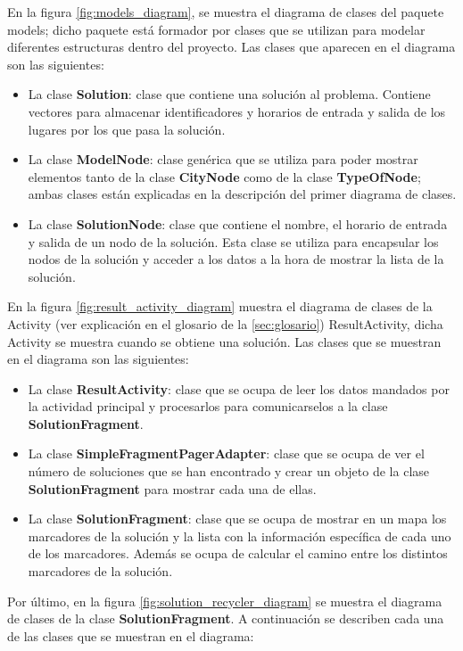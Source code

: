 \vspace{0.06in}
En la figura \ref{fig:models_diagram}, se muestra el diagrama de clases del paquete models; dicho paquete está formador por clases que se utilizan para modelar diferentes estructuras dentro del proyecto. Las clases que aparecen en el diagrama son las siguientes:
\begin{itemize}
	\item La clase \textbf{Solution}: clase que contiene una solución al problema. Contiene vectores para almacenar identificadores y horarios de entrada y salida de los lugares por los que pasa la solución.
	\item La clase \textbf{ModelNode}: clase genérica que se utiliza para poder mostrar elementos tanto de la clase \textbf{CityNode} como de la clase \textbf{TypeOfNode}; ambas clases están explicadas en la descripción del primer diagrama de clases.
	\item La clase \textbf{SolutionNode}: clase que contiene el nombre, el horario de entrada y salida de un nodo de la solución. Esta clase se utiliza para encapsular los nodos de la solución y acceder a los datos a la hora de mostrar la lista de la solución.
\end{itemize}
\vspace{0.06in}
En la figura \ref{fig:result_activity_diagram} muestra el diagrama de clases de la Activity (ver explicación en el glosario de la \autoref{sec:glosario}) ResultActivity, dicha Activity se muestra cuando se obtiene una solución. Las clases que se muestran en el diagrama son las siguientes:
\begin{itemize}
	\item La clase \textbf{ResultActivity}: clase que se ocupa de leer los datos mandados por la actividad principal y procesarlos para comunicarselos a la clase \textbf{SolutionFragment}.
	\item La clase \textbf{SimpleFragmentPagerAdapter}: clase que se ocupa de ver el número de soluciones que se han encontrado y crear un objeto de la clase \textbf{SolutionFragment} para mostrar cada una de ellas.
	\item La clase \textbf{SolutionFragment}: clase que se ocupa de mostrar en un mapa los marcadores de la solución y la lista con la información específica de cada uno de los marcadores. Además se ocupa de calcular el camino entre los distintos marcadores de la solución.
\end{itemize}
\vspace{0.06in}
Por último, en la figura \ref{fig:solution_recycler_diagram} se muestra el diagrama de clases de la clase \textbf{SolutionFragment}. A continuación se describen cada una de las clases que se muestran en el diagrama:

